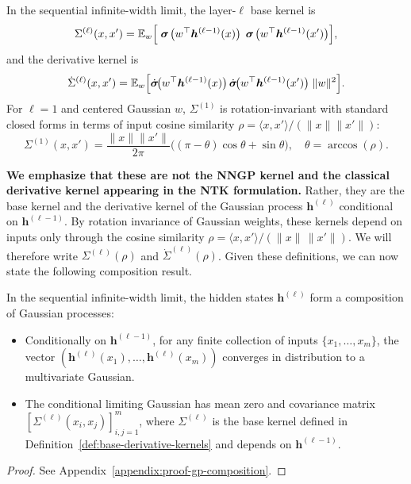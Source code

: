 \begin{definition}\label{def:base-derivative-kernels}
\vspace{0.3cm}
In the sequential infinite-width limit, the layer-\( \ell \) base kernel is
\begin{equation}
\Sigma^{(\ell)}(x,x')
= \mathbb{E}_{w}\Big[\bm{\mathrel{\boldsymbol{\sigma}}}\!\big(w^\top \bm{h}^{(\ell-1)}(x)\big)\,\bm{\mathrel{\boldsymbol{\sigma}}}\!\big(w^\top \bm{h}^{(\ell-1)}(x')\big)\Big],
\end{equation}
and the derivative kernel is
\begin{equation}
\dot{\Sigma}^{(\ell)}(x,x')
= \mathbb{E}_{w}\Big[\dot{\bm{\mathrel{\boldsymbol{\sigma}}}}\!\big(w^\top \bm{h}^{(\ell-1)}(x)\big)\,\dot{\bm{\mathrel{\boldsymbol{\sigma}}}}\!\big(w^\top \bm{h}^{(\ell-1)}(x')\big)\;\|w\|^2\Big].
\end{equation}
For \( \ell=1 \) and centered Gaussian \( w \), \( \Sigma^{(1)} \) is rotation-invariant with standard closed forms in terms of input cosine similarity \( \rho = \langle x,x'\rangle/(\|x\|\|x'\|) \):
\[
\Sigma^{(1)}(x,x') = \frac{\|x\|\|x'\|}{2\pi}\big((\pi-\theta)\cos\theta + \sin\theta\big), \quad \theta = \arccos(\rho).
\]
\end{definition}
\textbf{We emphasize that these are not the NNGP kernel and the classical derivative kernel appearing in the NTK formulation.}
Rather, they are the base kernel and the derivative kernel of the Gaussian process \( \bm{h}^{(\ell)} \) conditional on \( \bm{h}^{(\ell-1)} \).
By rotation invariance of Gaussian weights, these kernels depend on inputs only through the cosine similarity \(\rho=\langle x,x'\rangle/(\|x\|\,\|x'\|)\). We will therefore write \(\Sigma^{(\ell)}(\rho)\) and \(\dot{\Sigma}^{(\ell)}(\rho)\). Given these definitions, we can now state the following composition result.
\begin{theorem}\label{thm:gp-composition}
In the sequential infinite-width limit, the hidden states \( \bm{h}^{(\ell)} \) form a composition of Gaussian processes:
\begin{itemize}
    \item Conditionally on \( \bm{h}^{(\ell-1)} \), for any finite collection of inputs \( \{x_1, \dots, x_m\} \), the vector \( (\bm{h}^{(\ell)}(x_1), \dots, \bm{h}^{(\ell)}(x_m)) \) converges in distribution to a multivariate Gaussian.
    \item The conditional limiting Gaussian has mean zero and covariance matrix \( [\Sigma^{(\ell)}(x_i, x_j)]_{i,j=1}^m \), where \( \Sigma^{(\ell)} \) is the base kernel defined in Definition~\ref{def:base-derivative-kernels} and depends on \( \bm{h}^{(\ell-1)} \).
\end{itemize}
\end{theorem}
\begin{proof}
See Appendix~\ref{appendix:proof-gp-composition}.
\end{proof}

